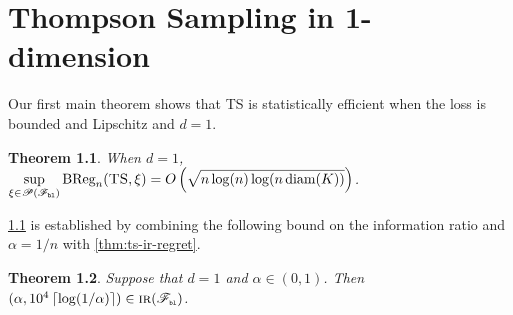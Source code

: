 \documentclass[letter, 12pt]{report}
\newcommand{\pb}{\text{\tiny\texttt{b}}}
\newcommand{\pl}{\text{\tiny\texttt{l}}}
\newcommand{\ceil}[1]{\left\lceil #1 \right\rceil}
\newcommand{\BReg}{\textrm{BReg}}
\newcommand{\sF}{\mathscr F}
\newcommand{\sP}{\mathscr P}
\newcommand{\diam}{\operatorname{diam}}
\newcommand{\1}{\mathbf{1}}
\newcommand{\IR}{\operatorname{\textsc{ir}}}
\newcommand{\ts}{\textsc{TS}\xspace}
\theoremstyle{plain}
\newtheorem{theorem}{Theorem}
\theoremstyle{definition}
\theoremstyle{remark}
\begin{document}
\chapter{Thompson Sampling in 1-dimension}
Our first main theorem shows that \ts{} is statistically efficient when the loss is bounded and Lipschitz and $d = 1$.
\begin{theorem}\label{thm:ts-1d}
    When $d = 1$, $\displaystyle \sup_{\xi \in \sP(\sF_{\pb\pl})} \BReg_n(\ts, \xi) = O\left(\sqrt{n \log(n) \log(n \diam(K))}\right)$.
\end{theorem}

\cref{thm:ts-1d} is established by combining the following bound on the information ratio and $\alpha = 1/n$ with \cref{thm:ts-ir-regret}.

\begin{theorem}\label{thm:ts}
    Suppose that $d = 1$ and $\alpha \in (0,1)$. Then $(\alpha, 10^4 \ceil{\log(1/\alpha)}) \in \IR(\sF_{\pb\pl})$.
\end{theorem}
\end{document}
